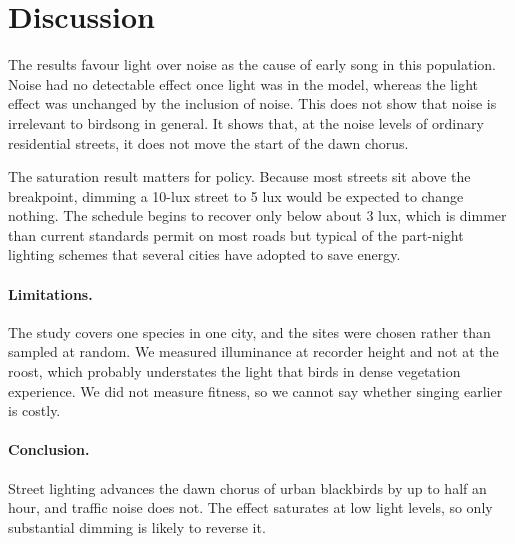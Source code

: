 \section{Discussion}
\label{sec:discussion}

The results favour light over noise as the cause of early song in this population. Noise had no detectable effect once light was in the model, whereas the light effect was unchanged by the inclusion of noise. This does not show that noise is irrelevant to birdsong in general. It shows that, at the noise levels of ordinary residential streets, it does not move the start of the dawn chorus.

The saturation result matters for policy. Because most streets sit above the breakpoint, dimming a 10-lux street to 5 lux would be expected to change nothing. The schedule begins to recover only below about 3 lux, which is dimmer than current standards permit on most roads but typical of the part-night lighting schemes that several cities have adopted to save energy.

\paragraph{Limitations.} The study covers one species in one city, and the sites were chosen rather than sampled at random. We measured illuminance at recorder height and not at the roost, which probably understates the light that birds in dense vegetation experience. We did not measure fitness, so we cannot say whether singing earlier is costly.

\paragraph{Conclusion.} Street lighting advances the dawn chorus of urban blackbirds by up to half an hour, and traffic noise does not. The effect saturates at low light levels, so only substantial dimming is likely to reverse it.
